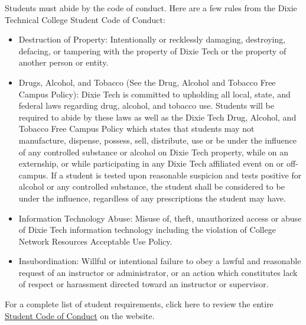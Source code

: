 Students must abide by the code of conduct.
Here are a few rules from the Dixie Technical
College Student Code of Conduct:
\begin{itemize}
    \item Destruction of Property: Intentionally
    or recklessly damaging, destroying, defacing,
    or tampering with the property of Dixie Tech
    or the property of another person or entity. 
    \item Drugs, Alcohol, and Tobacco (See the Drug,
    Alcohol and Tobacco Free Campus Policy): Dixie Tech
    is committed to upholding all local, state, and
    federal laws regarding drug, alcohol, and tobacco use.
    Students will be required to abide by these laws as
    well as the Dixie Tech Drug, Alcohol, and Tobacco
    Free Campus Policy which states that students may
    not manufacture, dispense, possess, sell, distribute,
    use or be under the influence of any controlled
    substance or alcohol on Dixie Tech property,
    while on an externship, or while participating in
    any Dixie Tech affiliated event on or off- campus.
    If a student is tested upon reasonable suspicion
    and tests positive for alcohol or any controlled
    substance, the student shall be considered to be
    under the influence, regardless of any prescriptions
    the student may have.
    \item Information Technology Abuse: Misuse of, theft,
    unauthorized access or abuse of Dixie Tech information
    technology including the violation of College Network
    Resources Acceptable Use Policy. 
    \item Insubordination: Willful or intentional failure
    to obey a lawful and reasonable request of an instructor
    or administrator, or an action which constitutes lack of
    respect or harassment directed toward an instructor or supervisor. 
\end{itemize}
For a complete list of student requirements, click here to review
the entire
\href{https://dixietech.edu/wp-content/uploads/files/policies/student-code-of-conduct.pdf}{Student Code of Conduct}
on the website.
